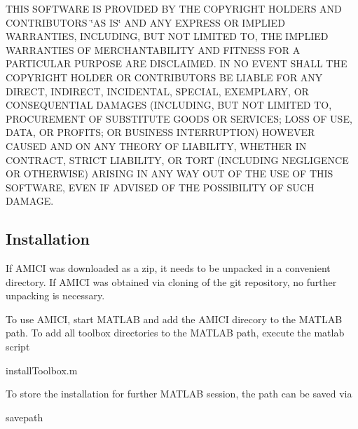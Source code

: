 T\+H\+I\+S S\+O\+F\+T\+W\+A\+R\+E I\+S P\+R\+O\+V\+I\+D\+E\+D B\+Y T\+H\+E C\+O\+P\+Y\+R\+I\+G\+H\+T H\+O\+L\+D\+E\+R\+S A\+N\+D C\+O\+N\+T\+R\+I\+B\+U\+T\+O\+R\+S \char`\"{}\+A\+S I\+S\char`\"{} A\+N\+D A\+N\+Y E\+X\+P\+R\+E\+S\+S O\+R I\+M\+P\+L\+I\+E\+D W\+A\+R\+R\+A\+N\+T\+I\+E\+S, I\+N\+C\+L\+U\+D\+I\+N\+G, B\+U\+T N\+O\+T L\+I\+M\+I\+T\+E\+D T\+O, T\+H\+E I\+M\+P\+L\+I\+E\+D W\+A\+R\+R\+A\+N\+T\+I\+E\+S O\+F M\+E\+R\+C\+H\+A\+N\+T\+A\+B\+I\+L\+I\+T\+Y A\+N\+D F\+I\+T\+N\+E\+S\+S F\+O\+R A P\+A\+R\+T\+I\+C\+U\+L\+A\+R P\+U\+R\+P\+O\+S\+E A\+R\+E D\+I\+S\+C\+L\+A\+I\+M\+E\+D. I\+N N\+O E\+V\+E\+N\+T S\+H\+A\+L\+L T\+H\+E C\+O\+P\+Y\+R\+I\+G\+H\+T H\+O\+L\+D\+E\+R O\+R C\+O\+N\+T\+R\+I\+B\+U\+T\+O\+R\+S B\+E L\+I\+A\+B\+L\+E F\+O\+R A\+N\+Y D\+I\+R\+E\+C\+T, I\+N\+D\+I\+R\+E\+C\+T, I\+N\+C\+I\+D\+E\+N\+T\+A\+L, S\+P\+E\+C\+I\+A\+L, E\+X\+E\+M\+P\+L\+A\+R\+Y, O\+R C\+O\+N\+S\+E\+Q\+U\+E\+N\+T\+I\+A\+L D\+A\+M\+A\+G\+E\+S (I\+N\+C\+L\+U\+D\+I\+N\+G, B\+U\+T N\+O\+T L\+I\+M\+I\+T\+E\+D T\+O, P\+R\+O\+C\+U\+R\+E\+M\+E\+N\+T O\+F S\+U\+B\+S\+T\+I\+T\+U\+T\+E G\+O\+O\+D\+S O\+R S\+E\+R\+V\+I\+C\+E\+S; L\+O\+S\+S O\+F U\+S\+E, D\+A\+T\+A, O\+R P\+R\+O\+F\+I\+T\+S; O\+R B\+U\+S\+I\+N\+E\+S\+S I\+N\+T\+E\+R\+R\+U\+P\+T\+I\+O\+N) H\+O\+W\+E\+V\+E\+R C\+A\+U\+S\+E\+D A\+N\+D O\+N A\+N\+Y T\+H\+E\+O\+R\+Y O\+F L\+I\+A\+B\+I\+L\+I\+T\+Y, W\+H\+E\+T\+H\+E\+R I\+N C\+O\+N\+T\+R\+A\+C\+T, S\+T\+R\+I\+C\+T L\+I\+A\+B\+I\+L\+I\+T\+Y, O\+R T\+O\+R\+T (I\+N\+C\+L\+U\+D\+I\+N\+G N\+E\+G\+L\+I\+G\+E\+N\+C\+E O\+R O\+T\+H\+E\+R\+W\+I\+S\+E) A\+R\+I\+S\+I\+N\+G I\+N A\+N\+Y W\+A\+Y O\+U\+T O\+F T\+H\+E U\+S\+E O\+F T\+H\+I\+S S\+O\+F\+T\+W\+A\+R\+E, E\+V\+E\+N I\+F A\+D\+V\+I\+S\+E\+D O\+F T\+H\+E P\+O\+S\+S\+I\+B\+I\+L\+I\+T\+Y O\+F S\+U\+C\+H D\+A\+M\+A\+G\+E.\hypertarget{index_install}{}\subsection{Installation}\label{index_install}
If A\+M\+I\+C\+I was downloaded as a zip, it needs to be unpacked in a convenient directory. If A\+M\+I\+C\+I was obtained via cloning of the git repository, no further unpacking is necessary.

To use A\+M\+I\+C\+I, start M\+A\+T\+L\+A\+B and add the A\+M\+I\+C\+I direcory to the M\+A\+T\+L\+A\+B path. To add all toolbox directories to the M\+A\+T\+L\+A\+B path, execute the matlab script 
\begin{DoxyCode}
installToolbox.m 
\end{DoxyCode}
 To store the installation for further M\+A\+T\+L\+A\+B session, the path can be saved via 
\begin{DoxyCode}
savepath 
\end{DoxyCode}


